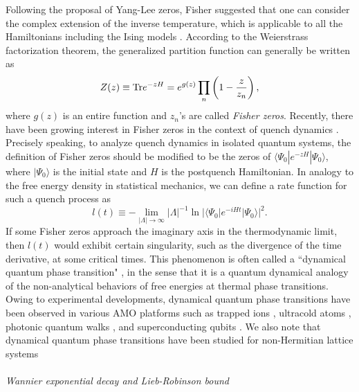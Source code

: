\documentclass{tADP2e}
\theoremstyle{plain}
\theoremstyle{plain}
\theoremstyle{definition}
\begin{document}
Following the proposal of Yang-Lee zeros, Fisher suggested that one can consider the complex extension of the inverse temperature, which is applicable to all the Hamiltonians including the Ising models \cite{FME65}. According to the Weierstrass factorization theorem, the generalized partition function can generally be written as
\begin{equation}
Z(z)\equiv{\rm Tr}e^{-zH}=e^{g(z)}\prod_n\left(1-\frac{z}{z_n}\right),
\end{equation}
where $g(z)$ is an entire function and $z_n$'s are called \emph{Fisher zeros}. Recently, there have been growing interest in Fisher zeros in the context of quench dynamics \cite{MH18}. Precisely speaking, to analyze quench dynamics in isolated quantum systems, the definition of Fisher zeros should be modified to be the zeros of $\langle\Psi_0|e^{-zH}|\Psi_0\rangle$, where $|\Psi_0\rangle$ is the initial state and $H$ is the postquench Hamiltonian. In analogy to the free energy density in statistical mechanics, we can define a {rate function} for such a quench process as
\begin{equation}
l(t)\equiv-\lim_{|\Lambda|\to\infty}|\Lambda|^{-1}\ln|\langle\Psi_0|e^{-iHt}|\Psi_0\rangle|^2.
\label{lt}
\end{equation}
If some Fisher zeros approach the {imaginary} axis in the thermodynamic limit, then $l(t)$ would exhibit certain singularity, such as the divergence of the time derivative, at some critical times. This phenomenon is often called a ``{dynamical quantum phase transition}" \cite{HM13}, in the sense that it is a quantum dynamical analogy of the non-analytical behaviors of free energies at thermal phase transitions. Owing to experimental developments, dynamical quantum phase transitions have been observed in various AMO platforms such as trapped ions \cite{JP17}, ultracold atoms \cite{NF18}, photonic quantum walks \cite{WK19}, and superconducting qubits \cite{GXY19}. We also note that dynamical quantum phase transitions have been studied for non-Hermitian lattice systems \cite{ZL18c}
\\ \\ {\it Wannier exponential decay and Lieb-Robinson bound}
\end{document}

